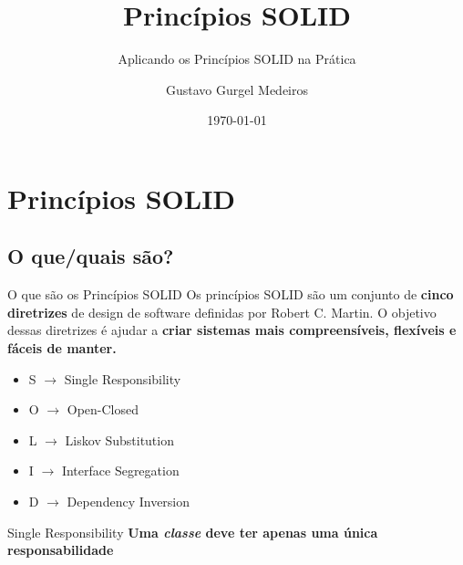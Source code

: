 \documentclass{libs/ufc_format}
\title[SOLID]{\huge\textbf{Princípios SOLID}}
\subtitle{Aplicando os Princípios SOLID na Prática}
\author{Gustavo Gurgel Medeiros}
\date{\today}
\begin{document}
\begin{frame}{}
    \maketitle
\end{frame}

\section{Princípios SOLID}
\subsection{O que/quais são?}
\begin{frame}{O que são os Princípios SOLID}
    Os princípios SOLID são um conjunto de \textbf{cinco diretrizes} de design
    de software definidas por Robert C. Martin. O objetivo dessas diretrizes é
    ajudar a \textbf{criar sistemas mais compreensíveis, flexíveis e fáceis de
    manter.}

    \vspace{25px}

    \begin{itemize}
        \item S $\rightarrow$ Single Responsibility
        \item O $\rightarrow$ Open-Closed 
        \item L $\rightarrow$ Liskov Substitution
        \item I $\rightarrow$ Interface Segregation
        \item D $\rightarrow$ Dependency Inversion
    \end{itemize}
\end{frame}

\begin{frame}{Single Responsibility}
    \centering
    \textbf{Uma \emph{classe} deve ter apenas uma única responsabilidade}
\end{frame}
\end{document}

